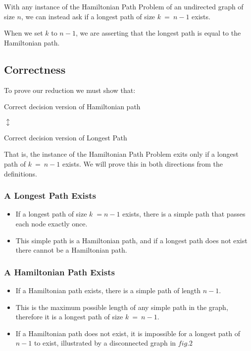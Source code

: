 \documentclass[a4paper,11pt]{article}
\begin{document}
With any instance of the Hamiltonian Path Problem of an undirected graph of size
$n$, we can instead ask if a longest path of size $k\:=\:n-1$ exists.

When we set $k$ to $n-1$, we are asserting that the longest path is equal to the
Hamiltonian path.

\subsection{Correctness}

To prove our reduction we must show that:

\begin{center}

    Correct decision version of Hamiltonian path

    $\updownarrow$

    Correct decision version of Longest Path

\end{center}

That is, the instance of the Hamiltonian Path Problem exits only if a longest
path of $k\:=\:n-1$ exists. We will prove this in both directions from the
definitions.

\subsubsection{A Longest Path Exists}

\begin{itemize}
    \item If a longest path of size $k\;=n-1$ exists, there is a simple path
          that passes each node exactly once.
    \item This simple path is a Hamiltonian path, and if a longest path does not
          exist there cannot be a Hamiltonian path.
\end{itemize}

\subsubsection{A Hamiltonian Path Exists}

\begin{itemize}
    \item If a Hamiltonian path exists, there is a simple path of length $n-1$.
    \item This is the maximum possible length of any simple path in the graph,
          therefore it is a longest path of size $k\:=\:n-1$.
    \item If a Hamiltonian path does not exist, it is impossible for a longest
          path of $n-1$ to exist, illustrated by a disconnected graph in $fig.2$
\end{itemize}
\end{document}

